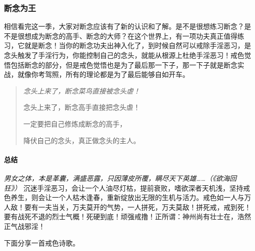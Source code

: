 \subsubsection{断念为王}

相信看完这一季，大家对断念应该有了新的认识和了解。是不是很想练习断念？是不是很想成为断念的高手、断念的大师？在这个世界上，有一项功夫真正值得练习，它就是断念！当你的断念功夫出神入化了，到时候自然可以戒除手淫恶习，是念头触发了手淫行为，你能控制自己的念头，就能从根源上杜绝手淫恶习！戒色觉悟包括断念的部分，但是戒色觉悟也是为了最后那一下子，那一下子就是断念实战，就像你考驾照，所有的理论都是为了最后能够自如开车。

\begin{quotation}\it
    念头上来了，断念菜鸟直接被念头虐！

    念头上来了，断念高手直接把念头虐！

    一定要把自己修炼成断念的高手，

    降伏自己的念头，真正做念头的主人。
\end{quotation}

\paragraph*{总结}

\textit{男女之体，本是革囊，满盛恶露，只因薄皮所覆，瞒尽天下英雄……（《欲海回狂》）} 沉迷手淫恶习，会让一个人油尽灯枯，提前衰败，嗜欲深者天机浅，坚持戒色养生，则会让一个人枯木逢春，重新绽放出无限的生机与活力。戒色如一人与万人敌！要有一夫当关，万夫莫开的气势，一人拼死，万夫莫敌！拼死戒，戒到死！要有战死不退的烈士气概！死硬到底！顽强戒撸！正所谓：神州尚有壮士在，浩然正气战邪淫！

下面分享一首戒色诗歌。

